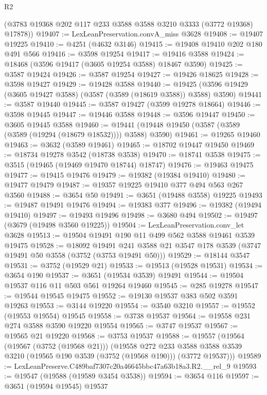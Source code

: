 \begin{lexlean}{R2}
\begin{coremodule}
      (@3783 @19368 @202 @117 @233 @3588 @3588 @3210 @3333 (@3772 @19368) @17878))
@19407 := LexLeanPreservation.convA_miss @3628
@19408 := @19407 @19225
@19410 := @4251 (@4632 @3146)
@19415 := @19408 @19410 @202 @180 @491 @566
@19416 := @3598 @19254
@19417 := @19416 @3588
@19424 := @18468 (@3596 @19417 (@3605 @19254 @3588) @18467 @3590)
@19425 := @3587 @19424
@19426 := @3587 @19254
@19427 := @19426 @18625
@19428 := @3598 @19427
@19429 := @19428 @3588
@19440 := @19425 (@3596 @19429 (@3605 @19427 @3588) (@3587 (@3589 (@18619 @3588)) @3588) @3590)
@19441 := @3587 @19440
@19445 := @3587 @19427 (@3599 @19278 @18664)
@19446 := @3598 @19445
@19447 := @19446 @3588
@19448 := @3596 @19447
@19450 := @3605 @19445 @3588
@19460 := @19441 (@19448 @19450 (@3587 (@3589 (@3589 (@19294 (@18679 @18532)))) @3588) @3590)
@19461 := @19265 @19460
@19463 := @3632 (@3589 @19461)
@19465 := @18702 @19447 @19450
@19469 := @18734 @19278 @3542 (@18738 @3538)
@19470 := @18741 @3538
@19475 := @3515 (@19465 (@19469 @19470 @18744) @18747)
@19476 := @19463 @19475
@19477 := @19415 @19476
@19479 := @19382 (@19384 @19410)
@19480 := @19477 @19479
@19487 := @19357 @19225 @19410 @377 @494 @563 @267 @3560
@19488 := @3654 @50
@19491 := @3651 (@19488 @3558) @19225
@19493 := @19487 @19491 @19476
@19494 := @19383 @377
@19496 := @19382 (@19494 @19410)
@19497 := @19493 @19496
@19498 := @3680 @494
@19502 := @19497 (@3679 (@19498 @3560 @19225))
@19504 := LexLeanPreservation.conv_let @3628
@19513 := @19504 @19491 @190 @11 @499 @562 @3588 @19461 @3539 @19475
@19528 := @18092
    @19491
    @241
    @3588
    @21
    @3547
    @178
    @3539
    (@3747 @19491 @50 @3558 (@3752 (@3753 @19491 @50)))
@19529 := @18144 @3547
@19531 := @3752 (@19529 @21)
@19533 := @19513 (@19528 @19531)
@19534 := @3654 @190
@19537 := @3651 (@19534 @3539) @19491
@19544 := @19504 @19537 @116 @11 @503 @561 @19264 @19460
@19545 := @285 @19278
@19547 := @19544 @19545 @19475
@19552 := @19130 @19537 @383 @502 @3591 @19263
@19553 := @3144 @19220
@19554 := @3540 @3210
@19557 := @19552 (@19553 @19554) @19545
@19558 := @3738 @19537
@19564 := @19558 @231 @274 @3588 @3590 @19220 @19554
@19565 := @3747 @19537
@19567 := @19565 @21 @19220
@19568 := @3753 @19537
@19588 := @19557
    (@19564
      (@19567 (@3752 (@19568 @21)))
      (@19558
        @272
        @233
        @3588
        @3588
        @3539
        @3210
        (@19565 @190 @3539 (@3752 (@19568 @190)))
        (@3772 @19537)))
@19589 := LexLeanPreserve.C489baf7307c20a46645bbc47a63b18a3.R2.__rel_9
@19593 := @19547 (@19588 (@19589 @3454 @3538))
@19594 := @3654 @116
@19597 := @3651 (@19594 @19545) @19537

\end{coremodule}
\end{lexlean}
